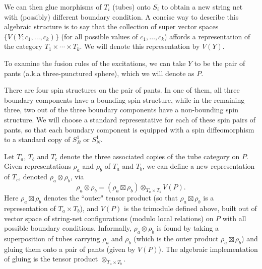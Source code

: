 \documentclass[12pt,a4paper]{article}
\newcommand{\tp}{\otimes}
\newcommand\be            {\begin{equation}}
\newcommand\ee            {\end{equation}}
\begin{document}
We can then glue morphisms of $T_i$ (tubes) onto $S_i$ to obtain a new string net with (possibly) different boundary condition.
A concise way to describe this algebraic structure is to say that the collection of super vector spaces $\{V(Y; c_1,\ldots,c_k)\}$
(for all possible values of $c_1,\ldots,c_k$)
affords a representation of the category $T_1\times\cdots\times T_k$.
We will denote this representation by $V(Y)$.

To examine the fusion rules of the excitations, we can take $Y$ to be the 
pair of pants (a.k.a three-punctured sphere), which we will denote as $P$. 

There are four spin structures on the pair of pants. 
In one of them, all three boundary components have a bounding spin structure, while in 
the remaining three, two out of the three boundary components have a non-bounding spin structure.
We will choose a standard representative for each of these spin pairs of pants, 
so that each boundary component is equipped with a spin diffeomorphism to a 
standard copy of $S^1_B$ or $S^1_N$.

Let $T_a$, $T_b$ and $T_c$ denote the three associated copies of the tube category on $P$.
Given representations $\rho_a$ and $\rho_b$ of $T_a$ and $T_b$, we can define a new representation of $T_c$,
denoted $\rho_a\tp\rho_b$, via
\be  \label{tctpdef}
	\rho_a\tp\rho_b = (\rho_a \boxtimes \rho_b) \tp_{T_a\times T_b} V(P) .
\ee
Here $\rho_a \boxtimes \rho_b$ denotes the ``outer" tensor product (so that $\rho_a \boxtimes \rho_b$ is a representation of $T_a\times T_b$), 
and $V(P)$ is the 
trimodule defined above, built out of
vector space of string-net configurations (modulo local relations) on $P$ with all possible boundary conditions. 
Informally, $\rho_a\tp \rho_b$ is found by taking a superposition of tubes carrying $\rho_a$ and $\rho_b$ 
(which is the outer product $\rho_a\boxtimes\rho_b$) and gluing them onto a pair of pants (given by $V(P)$). 
The algebraic implementation of gluing is the tensor product $\tp_{T_a\times T_b}$. 
\end{document}
